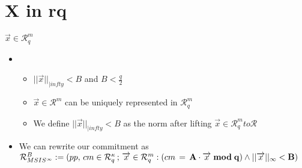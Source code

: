 \section{X in rq}
\begin{frame}{$\overrightarrow{x} \in \mathcal{R}^\mathit{m}_\mathit{q}$}
    \begin{itemize}
        \item  \begin{itemize}
                  \item $||\overrightarrow{x}||_{|infty} < B$ and $B < \frac{q}{2}$
                  \item $\overrightarrow{x} \in \mathcal{R}^m$ can be uniquely represented in $\mathcal{R}^m_q$
                  \item We define $||\overrightarrow{x}||_{|infty} < B$ as the norm after lifting $\overrightarrow{x} \in \mathcal{R}^m_q to \mathcal{R}$
              \end{itemize}
        \item We can rewrite our commitment as $\mathcal{R}^B_{MSIS^{\infty}} := {(pp, \, cm \in \mathcal{R}^{\kappa}_q\, ;\, \overrightarrow{x} \in \mathcal{R}^m_q : (cm\, =\, \bf{A}\cdot \overrightarrow{x} \; mod \; q) \land ||\overrightarrow{x}||_{\infty} < B  )}$
    \end{itemize}


\end{frame}